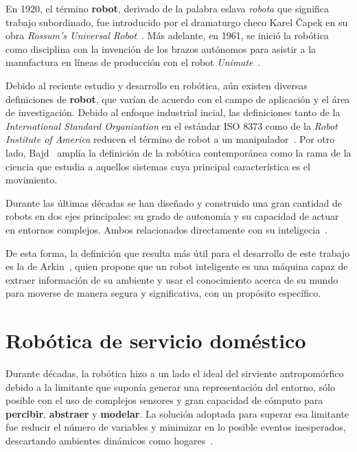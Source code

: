 En 1920, el término \textbf{robot}, derivado de la palabra eslava \emph{robota} que significa trabajo subordinado, fue introducido por el dramaturgo checo Karel Čapek en su obra \emph{Rossum's Universal Robot}~\cite{robotics_handbook}. Más adelante, en 1961, se inició la robótica como disciplina con la invención de los brazos autónomos para asistir a la manufactura en líneas de producción con el robot \emph{Unimate}~\cite{yazmin_intro}.

Debido al reciente estudio y desarrollo en robótica, aún existen diversas definiciones de \textbf{robot}, que varían de acuerdo con el campo de aplicación y el área de investigación. Debido al enfoque industrial incial, las definiciones tanto de la \emph{International Standard Organization} en el estándar ISO 8373 como de la \emph{Robot Institute of America} reducen el término de robot a un manipulador~\cite{yazmin_robotsServicio}. Por otro lado, Bajd~\cite{bajd_introRobotics} amplía la definición de la robótica contemporánea como la rama de la ciencia que estudia a aquellos sistemas cuya principal característica es el movimiento.

Durante las últimas décadas se han diseñado y construido una gran cantidad de robots en dos ejes principales: su grado de autonomía y su capacidad de actuar en entornos complejos. Ambos relacionados directamente con su inteligecia~\cite{yazmin_intro}.

\hypertarget{arkin}{De esta forma, la definición que resulta más útil para el desarrollo de este trabajo es la de Arkin~\cite{arkin}, quien propone que un robot inteligente es una máquina capaz de extraer información de su ambiente y usar el conocimiento acerca de su mundo para moverse de manera segura y significativa, con un propósito específico.}

\section{Robótica de servicio doméstico}

Durante décadas, la robótica hizo a un lado el ideal del sirviente antropomórfico debido a la limitante que suponía generar una representación del entorno, sólo posible con el uso de complejos sensores y gran capacidad de cómputo para \textbf{percibir}, \textbf{abstraer} y \textbf{modelar}. La solución adoptada para superar esa limitante fue reducir el número de variables y minimizar en lo posible eventos inesperados, descartando ambientes dinámicos como hogares~\cite{yazmin_robotsServicio}.

